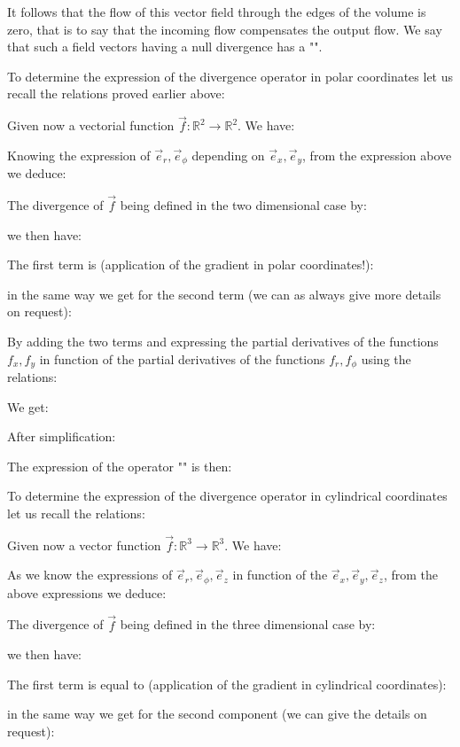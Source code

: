 	It follows that the flow of this vector field through the edges of the volume is zero, that is to say that the incoming flow compensates the output flow. We say that such a field vectors having a null divergence has a "".
	
	To determine the expression of the divergence operator in polar coordinates let us recall the relations proved earlier above:
	
	Given now a vectorial function $\vec{f}:\mathbb{R}^2\rightarrow \mathbb{R}^2$. We have:
	
	Knowing the expression of $\vec{e}_r,\vec{e}_\phi$ depending on $\vec{e}_x,\vec{e}_y$, from the expression above we deduce:
	
	The divergence of $\vec{f}$ being defined in the two dimensional case by:
	
	we then have:
	
	The first term is (application of the gradient in polar coordinates!):
	
	in the same way we get for the second term (we can as always give more details on request):
	
	By adding the two terms and expressing the partial derivatives of the functions $f_x,f_y$ in function of the partial derivatives of the functions $f_r,f_\phi$ using the relations:
	
	We get:
	
	After simplification:
	
	The expression of the operator "" is then:
	
	To determine the expression of the divergence operator in cylindrical coordinates let us recall the relations:
	
	Given now a vector function $\vec{f}:\mathbb{R}^3\rightarrow \mathbb{R}^3$. We have:
	
	As we know the expressions of $\vec{e}_r,\vec{e}_\phi,\vec{e}_z$ in function of the $\vec{e}_x,\vec{e}_y,\vec{e}_z$, from the above expressions we deduce:
	
	The divergence of $\vec{f}$ being defined in the three dimensional case by:
	
	we then have:
	
	The first term is equal to (application of the gradient in cylindrical coordinates):
	
	in the same way we get for the second component (we can give the details on request):
	
